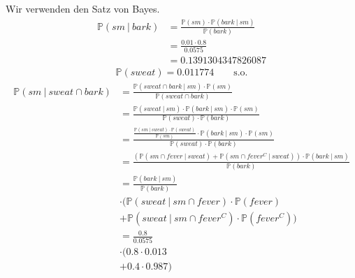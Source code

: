 \documentclass[a4paper]{scrartcl}
\newcommand{\prob}{\mathbb{P}}
\begin{document}
Wir verwenden den Satz von Bayes.
\begin{equation*}
    \begin{split}
        \prob(sm\ |\ bark)
        &= \frac{\prob(sm) \cdot \prob(bark\ |\ sm)}{\prob(bark)} \\
        &= \frac{\num{0,01} \cdot \num{0,8}}{\num{0,0575}} \\
        &= \num{0.1391304347826087}
    \end{split}
\end{equation*}
\begin{equation*}
    \begin{split}
        \prob(sweat) = \num{0.011774}
        \qquad \text{s.o.}
    \end{split}
\end{equation*}
\begin{equation*}
    \begin{split}
        \prob(sm\ |\ sweat \cap bark)
        &= \frac{\prob(sweat \cap bark\ |\ sm) \cdot \prob(sm)}{\prob(sweat \cap bark)} \\
        &= \frac{\prob(sweat\ |\ sm) \cdot \prob(bark\ |\ sm) \cdot \prob(sm)}{\prob(sweat) \cdot \prob(bark)} \\
        &= \frac{\frac{\prob(sm\ |\ sweat) \cdot \prob(sweat)}{\prob(sm)} \cdot \prob(bark\ |\ sm) \cdot \prob(sm)}{\prob(sweat) \cdot \prob(bark)} \\
        &= \frac{(\prob(sm \cap fever\ |\ sweat) + \prob(sm \cap fever^C\ |\ sweat)) \cdot \prob(bark\ |\ sm)}{\prob(bark)} \\
        &= \frac{\prob(bark\ |\ sm)}{\prob(bark)} \\
        &\cdot (\prob(sweat\ |\ sm \cap fever) \cdot \prob(fever) \\
        &+ \prob(sweat\ |\ sm \cap fever^C) \cdot \prob(fever^C)) \\
        &= \frac{\num{0,8}}{\num{0,0575}} \\
        &\cdot (\num{0,8} \cdot \num{0,013} \\
        &+ \num{0,4} \cdot \num{0,987}) \\
    \end{split}
\end{equation*}
\end{document}
